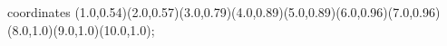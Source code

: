 					coordinates { (1.0,0.54)(2.0,0.57)(3.0,0.79)(4.0,0.89)(5.0,0.89)(6.0,0.96)(7.0,0.96)(8.0,1.0)(9.0,1.0)(10.0,1.0)};